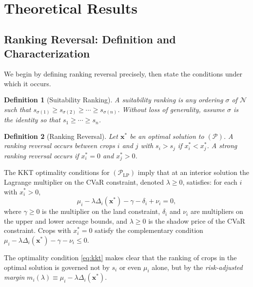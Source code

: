 \documentclass[12pt,review,authoryear]{elsarticle}
\numberwithin{equation}{section}
\newtheorem{definition}{Definition}[section]
\begin{document}
\section{Theoretical Results}
\label{sec:theory}

\subsection{Ranking Reversal: Definition and Characterization}

We begin by defining ranking reversal precisely, then state the conditions
under which it occurs.

\begin{definition}[Suitability Ranking]
A suitability ranking is any ordering $\sigma$ of $\mathcal{N}$ such that
$s_{\sigma(1)} \geq s_{\sigma(2)} \geq \cdots \geq s_{\sigma(n)}$.
Without loss of generality, assume $\sigma$ is the identity so that
$s_1 \geq \cdots \geq s_n$.
\end{definition}

\begin{definition}[Ranking Reversal]
\label{def:rr}
Let $\mathbf{x}^*$ be an optimal solution to $(\mathcal{P})$.  A
\emph{ranking reversal} occurs between crops $i$ and $j$ with $s_i > s_j$
if $x_i^* < x_j^*$.  A \emph{strong ranking reversal} occurs if
$x_i^* = 0$ and $x_j^* > 0$.
\end{definition}

The KKT optimality conditions for $(\mathcal{P}_{\text{LP}})$ imply that
at an interior solution the Lagrange multiplier on the CVaR constraint,
denoted $\lambda \geq 0$, satisfies: for each $i$ with $x_i^* > 0$,
\begin{equation}
\mu_i - \lambda \Delta_i(\mathbf{x}^*) - \gamma - \delta_i + \nu_i = 0,
\label{eq:kkt}
\end{equation}
where $\gamma \geq 0$ is the multiplier on the land constraint, $\delta_i$
and $\nu_i$ are multipliers on the upper and lower acreage bounds,
and $\lambda \geq 0$ is the shadow price of the CVaR constraint.  Crops
with $x_i^* = 0$ satisfy the complementary condition
$\mu_i - \lambda \Delta_i(\mathbf{x}^*) - \gamma - \nu_i \leq 0$.

The optimality condition \eqref{eq:kkt} makes clear that the ranking of
crops in the optimal solution is governed not by $s_i$ or even $\mu_i$
alone, but by the \emph{risk-adjusted margin}
$m_i(\lambda) \equiv \mu_i - \lambda \Delta_i(\mathbf{x}^*)$.
\end{document}
